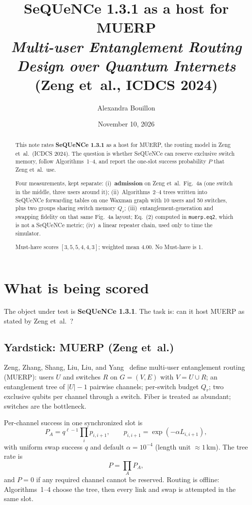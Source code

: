 \documentclass[11pt]{article}
\title{SeQUeNCe 1.3.1 as a host for MUERP\\[0.35em]
{\large \emph{Multi-user Entanglement Routing Design over Quantum Internets}\\
(Zeng et~al., ICDCS 2024)}}
\author{Alexandra Bouillon}
\date{November 10, 2026}
\begin{document}
\maketitle

\begin{abstract}
This note rates \textbf{SeQUeNCe 1.3.1} as a host for MUERP, the routing model in Zeng et~al.\ (ICDCS 2024).
The question is whether SeQUeNCe can reserve exclusive switch memory, follow Algorithms~1--4, and report the one-slot success probability $P$ that Zeng et~al.\ use.

Four measurements, kept separate:
(i)~\textbf{admission} on Zeng et~al.\ Fig.~4a (one switch in the middle, three users around it);
(ii)~Algorithms~2--4 trees written into SeQUeNCe forwarding tables on one Waxman graph with 10 users and 50 switches, plus two groups sharing switch memory $Q_r$;
(iii)~entanglement-generation and swapping fidelity on that same Fig.~4a layout; Eq.~(2) computed in \texttt{muerp.eq2}, which is not a SeQUeNCe metric;
(iv)~a linear repeater chain, used only to time the simulator.

Must-have scores $[3,5,5,4,4,3]$; weighted mean $4.00$. No Must-have is 1.
\end{abstract}

\tableofcontents
\vspace{1em}

\section{What is being scored}

The object under test is \textbf{SeQUeNCe 1.3.1}.
The task is: can it host MUERP as stated by Zeng et~al.~\cite{zeng2024}?

\subsection{Yardstick: MUERP (Zeng et~al.)}

Zeng, Zhang, Shang, Liu, Liu, and Yang~\cite{zeng2024} define multi-user entanglement routing (MUERP):
users $U$ and switches $R$ on $G=(V,E)$ with $V=U\cup R$; an entanglement tree of $|U|-1$ pairwise channels; per-switch budget $Q_r$; two exclusive qubits per channel through a switch.
Fiber is treated as abundant; switches are the bottleneck.

Per-channel success in one synchronized slot is
\begin{equation}
P_A = q^{\ell-1}\prod_{i} p_{i,i+1},\qquad
p_{i,i+1}=\exp(-\alpha L_{i,i+1}),
\label{eq:pa}
\end{equation}
with uniform swap success $q$ and default $\alpha=10^{-4}$ (length unit $\approx 1$\,km).
The tree rate is
\begin{equation}
P=\prod_{A} P_A,
\label{eq:p}
\end{equation}
and $P=0$ if any required channel cannot be reserved.
Routing is offline: Algorithms~1--4 choose the tree, then every link and swap is attempted in the same slot.
\end{document}
